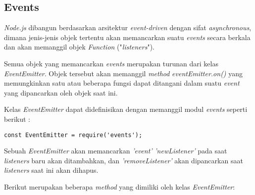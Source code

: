 \begin{itemize}
\end{itemize}

\subsection{Events}
\textit{Node.js} dibangun berdasarkan arsitektur \textit{event-driven} dengan sifat \textit{asynchronous}, dimana jenis-jenis objek tertentu akan memancarkan suatu \textit{events} secara berkala dan akan memanggil objek \textit{Function} ("\textit{listeners}").

Semua objek yang memancarkan \textit{events} merupakan turunan dari kelas \textit{EventEmitter}. Objek tersebut akan memanggil \textit{method} \textit{eventEmitter.on()} yang memungkinkan satu atau beberapa fungsi dapat ditangani dalam suatu \textit{event} yang dipancarkan oleh objek saat ini.

Kelas \textit{EventEmitter} dapat didefinisikan dengan memanggil modul \textit{events} seperti berikut :

\begin{lstlisting}
const EventEmitter = require('events');
\end{lstlisting}

Sebuah \textit{EventEmitter} akan memancarkan \textit{'event'} \textit{'newListener'} pada saat \textit{listeners} baru akan ditambahkan, dan \textit{'removeListener'} akan dipancarkan saat \textit{listeners} saat ini akan dihapus.

Berikut merupakan beberapa \textit{method} yang dimiliki oleh kelas \textit{EventEmitter}:


